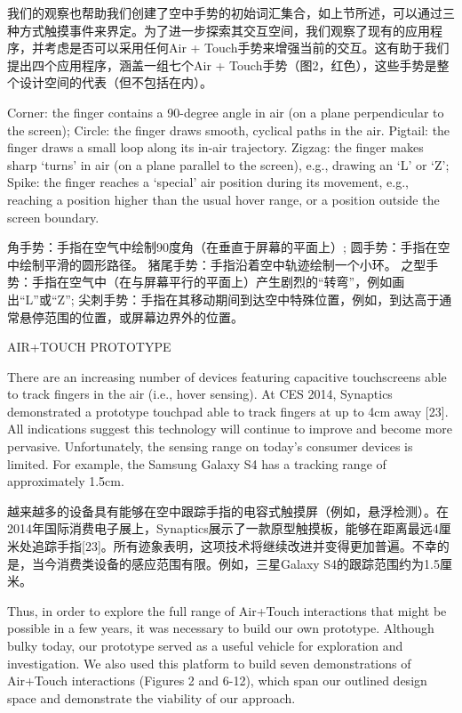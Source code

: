 我们的观察也帮助我们创建了空中手势的初始词汇集合，如上节所述，可以通过三种方式触摸事件来界定。为了进一步探索其交互空间，我们观察了现有的应用程序，并考虑是否可以采用任何Air + Touch手势来增强当前的交互。这有助于我们提出四个应用程序，涵盖一组七个Air + Touch手势（图2，红色），这些手势是整个设计空间的代表（但不包括在内）。

Corner: the finger contains a 90-degree angle in air (on a plane perpendicular to the screen);
Circle: the finger draws smooth, cyclical paths in the air.
Pigtail: the finger draws a small loop along its in-air trajectory.
Zigzag: the finger makes sharp ‘turns’ in air (on a plane parallel to the screen), e.g., drawing an ‘L’ or ‘Z’; 
Spike: the finger reaches a ‘special’ air position during its movement, e.g., reaching a position higher than the usual hover range, or a position outside the screen boundary.

角手势：手指在空气中绘制90度角（在垂直于屏幕的平面上）;
圆手势：手指在空中绘制平滑的圆形路径。
猪尾手势：手指沿着空中轨迹绘制一个小环。
之型手势：手指在空气中（在与屏幕平行的平面上）产生剧烈的“转弯”，例如画出“L”或“Z”;
尖刺手势：手指在其移动期间到达空中特殊位置，例如，到达高于通常悬停范围的位置，或屏幕边界外的位置。

AIR+TOUCH PROTOTYPE

There are an increasing number of devices featuring capacitive touchscreens able to track fingers in the air (i.e., hover sensing). At CES 2014, Synaptics demonstrated a prototype touchpad able to track fingers at up to 4cm away [23]. All indications suggest this technology will continue to improve and become more pervasive. Unfortunately, the sensing range on today’s consumer devices is limited. For example, the Samsung Galaxy S4 has a tracking range of approximately 1.5cm.

越来越多的设备具有能够在空中跟踪手指的电容式触摸屏（例如，悬浮检测）。在2014年国际消费电子展上，Synaptics展示了一款原型触摸板，能够在距离最远4厘米处追踪手指[23]。所有迹象表明，这项技术将继续改进并变得更加普遍。不幸的是，当今消费类设备的感应范围有限。例如，三星Galaxy S4的跟踪范围约为1.5厘米。

Thus, in order to explore the full range of Air+Touch interactions that might be possible in a few years, it was necessary to build our own prototype. Although bulky today, our prototype served as a useful vehicle for exploration and investigation. We also used this platform to build seven demonstrations of Air+Touch interactions (Figures 2 and 6-12), which span our outlined design space and demonstrate the viability of our approach. 

